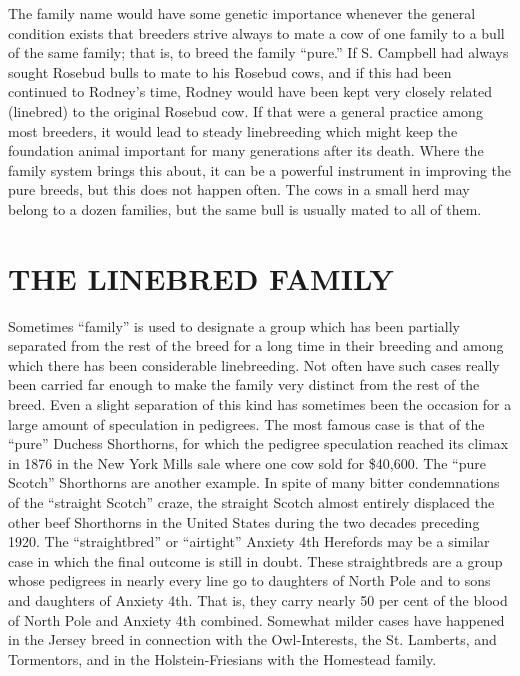 The family name would have some genetic importance whenever
the general condition exists that breeders strive always to mate a cow of
one family to a bull of the same family; that is, to breed the family
``pure.'' If S. Campbell had always sought Rosebud bulls to mate to his
Rosebud cows, and if this had been continued to Rodney's time, Rodney
would have been kept very closely related (linebred) to the original
Rosebud cow. If that were a general practice among most breeders, it
would lead to steady linebreeding which might keep the foundation
animal important for many generations after its death. Where the family
system brings this about, it can be a powerful instrument in improving
the pure breeds, but this does not happen often. The cows in a small
herd may belong to a dozen families, but the same bull is usually mated
to all of them.

\section*{THE LINEBRED FAMILY}

Sometimes ``family'' is used to designate a group which has been
partially separated from the rest of the breed for a long time in their
breeding and among which there has been considerable linebreeding.
Not often have such cases really been carried far enough to make the
family very distinct from the rest of the breed. Even a slight separation
of this kind has sometimes been the occasion for a large amount of
speculation in pedigrees. The most famous case is that of the ``pure''
Duchess Shorthorns, for which the pedigree speculation reached its
climax in 1876 in the New York Mills sale where one cow sold for
\$40,600. The ``pure Scotch'' Shorthorns are another example. In spite
of many bitter condemnations of the ``straight Scotch'' craze, the
straight Scotch almost entirely displaced the other beef Shorthorns in
the United States during the two decades preceding 1920. The ``straightbred''
or ``airtight'' Anxiety 4th Herefords may be a similar case in
which the final outcome is still in doubt. These straightbreds are a
group whose pedigrees in nearly every line go to daughters of North
Pole and to sons and daughters of Anxiety 4th. That is, they carry nearly
50 per cent of the blood of North Pole and Anxiety 4th combined.
Somewhat milder cases have happened in the Jersey breed in connection
with the Owl-Interests, the St. Lamberts, and Tormentors, and in
the Holstein-Friesians with the Homestead family.

